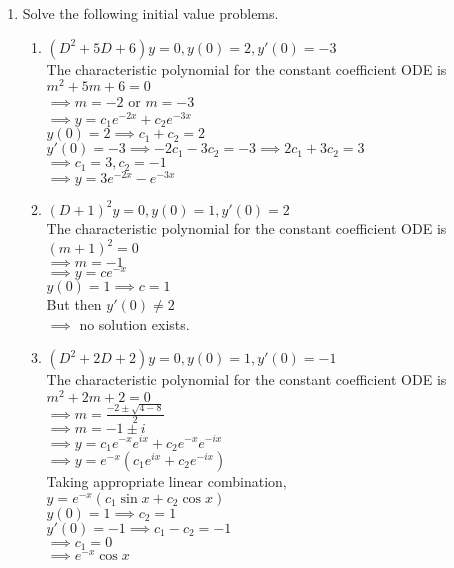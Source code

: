 \documentclass[a4paper]{article}
\begin{document}
\begin{enumerate}
	\item Solve the following initial value problems.
	\begin{enumerate}
		\item $(D^2+5D+6)y=0, y(0)=2, y'(0)=-3$\\
			The characteristic polynomial for the constant coefficient ODE is\\
			$m^2+5m+6=0$\\
			$\implies m=-2$ or $m=-3$\\
			$\implies y=c_1e^{-2x}+c_2e^{-3x}$\\
			$y(0)=2 \implies c_1+c_2=2$\\
			$y'(0)=-3 \implies -2c_1-3c_2=-3 \implies 2c_1+3c_2=3$\\
			$\implies c_1=3, c_2=-1$\\
			$\implies y=3e^{-2x}-e^{-3x}$
			
		\item $(D+1)^2y=0, y(0)=1, y'(0)=2$\\
			The characteristic polynomial for the constant coefficient ODE is\\
			$(m+1)^2=0$\\
			$\implies m=-1$\\
			$\implies y=ce^{-x}$\\
			$y(0)=1 \implies c=1$\\
			But then $y'(0)\neq 2$\\
			$\implies$ no solution exists.
			
		\item $(D^2+2D+2)y=0, y(0)=1, y'(0)=-1$\\
			The characteristic polynomial for the constant coefficient ODE is\\
			$m^2+2m+2=0$\\
			$\implies m=\frac{-2\pm\sqrt{4-8}}{2}$\\
			$\implies m=-1\pm i$\\
			$\implies y=c_1e^{-x}e^{ix} + c_2e^{-x}e^{-ix}$\\
			$\implies y=e^{-x}(c_1e^{ix} + c_2e^{-ix})$\\
			Taking appropriate linear combination,\\
			$y=e^{-x}(c_1\sin x + c_2\cos x)$\\
			$y(0)=1 \implies c_2=1$\\
			$y'(0)=-1 \implies c_1-c_2=-1$\\
			$\implies c_1=0$\\
			$\implies e^{-x}\cos x$
			

\end{enumerate}
\end{enumerate}
\end{document}
